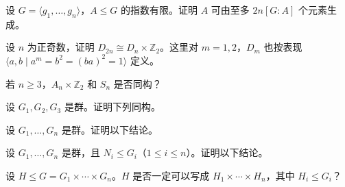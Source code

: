 \noindent\begin{minipage}{\textwidth}
设 $G=\langle g_1,\ldots,g_n\rangle$，$A\le G$ 的指数有限。证明 $A$ 可由至多 $2n[G:A]$ 个元素生成。
\end{minipage}\par\vfill
\newpage
\noindent\begin{minipage}{\textwidth}
设 $n$ 为正奇数，证明 $D_{2n}\cong D_n\times\mathbb Z_2$。这里对 $m=1,2$，$D_m$ 也按表现 $\langle a,b\mid a^m=b^2=(ba)^2=1\rangle$ 定义。
\end{minipage}\par\vfill
\noindent\begin{minipage}{\textwidth}
若 $n\ge3$，$A_n\times\mathbb Z_2$ 和 $S_n$ 是否同构？
\end{minipage}\par\vfill
\noindent\begin{minipage}{\textwidth}
设 $G_1,G_2,G_3$ 是群。证明下列同构。
\end{minipage}\par\vfill
\newpage
\noindent\begin{minipage}{\textwidth}
设 $G_1,\ldots,G_n$ 是群。证明以下结论。
\end{minipage}\par\vfill
\noindent\begin{minipage}{\textwidth}
设 $G_1,\ldots,G_n$ 是群，且 $N_i\le G_i$（$1\le i\le n$）。证明以下结论。
\end{minipage}\par\vfill
\noindent\begin{minipage}{\textwidth}
设 $H\le G=G_1\times\cdots\times G_n$。$H$ 是否一定可以写成 $H_1\times\cdots\times H_n$，其中 $H_i\le G_i$？
\end{minipage}\par\vfill
